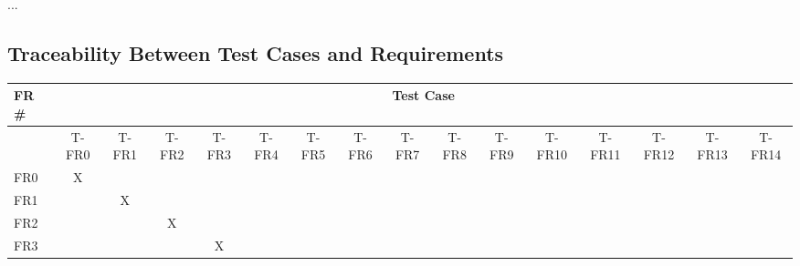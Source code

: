 \documentclass[12pt, titlepage]{article}
\begin{document}
...

\subsection{Traceability Between Test Cases and Requirements}

\setlength\LTleft{-3cm}
\tiny
\begin{longtable}{llllllllllllllll}
\multicolumn{1}{l|}{FR \#} & \multicolumn{15}{c}{Test Case} \\ \hline
\endfirsthead
%
\endhead
%
\multicolumn{1}{l|}{} & \multicolumn{1}{c}{T-FR0} & \multicolumn{1}{c}{T-FR1} & \multicolumn{1}{c}{T-FR2} & \multicolumn{1}{c}{T-FR3} & \multicolumn{1}{c}{T-FR4} & \multicolumn{1}{c}{T-FR5} & \multicolumn{1}{c}{T-FR6} & \multicolumn{1}{c}{T-FR7} & \multicolumn{1}{c}{T-FR8} & \multicolumn{1}{c}{T-FR9} & \multicolumn{1}{c}{T-FR10} & \multicolumn{1}{c}{T-FR11} & \multicolumn{1}{c}{T-FR12} & \multicolumn{1}{c}{T-FR13} & \multicolumn{1}{c}{T-FR14} \\
\multicolumn{1}{l|}{FR0} & \multicolumn{1}{c}{X} & \multicolumn{1}{c}{} & \multicolumn{1}{c}{} & \multicolumn{1}{c}{} & \multicolumn{1}{c}{} & \multicolumn{1}{c}{} & \multicolumn{1}{c}{} & \multicolumn{1}{c}{} & \multicolumn{1}{c}{} & \multicolumn{1}{c}{} &  & \multicolumn{1}{c}{} & \multicolumn{1}{c}{} & \multicolumn{1}{c}{} & \multicolumn{1}{c}{} \\
\multicolumn{1}{l|}{FR1} & \multicolumn{1}{c}{} & \multicolumn{1}{c}{X} & \multicolumn{1}{c}{} & \multicolumn{1}{c}{} & \multicolumn{1}{c}{} & \multicolumn{1}{c}{} & \multicolumn{1}{c}{} & \multicolumn{1}{c}{} & \multicolumn{1}{c}{} & \multicolumn{1}{c}{} &  & \multicolumn{1}{c}{} & \multicolumn{1}{c}{} & \multicolumn{1}{c}{} & \multicolumn{1}{c}{} \\
\multicolumn{1}{l|}{FR2} & \multicolumn{1}{c}{} & \multicolumn{1}{c}{} & \multicolumn{1}{c}{X} & \multicolumn{1}{c}{} & \multicolumn{1}{c}{} & \multicolumn{1}{c}{} & \multicolumn{1}{c}{} & \multicolumn{1}{c}{} & \multicolumn{1}{c}{} & \multicolumn{1}{c}{} &  & \multicolumn{1}{c}{} & \multicolumn{1}{c}{} & \multicolumn{1}{c}{} & \multicolumn{1}{c}{} \\
\multicolumn{1}{l|}{FR3} & \multicolumn{1}{c}{} & \multicolumn{1}{c}{} & \multicolumn{1}{c}{} & \multicolumn{1}{c}{X} & \multicolumn{1}{c}{} & \multicolumn{1}{c}{} & \multicolumn{1}{c}{} & \multicolumn{1}{c}{} & \multicolumn{1}{c}{} & \multicolumn{1}{c}{} &  & \multicolumn{1}{c}{} & \multicolumn{1}{c}{} & \multicolumn{1}{c}{} & \multicolumn{1}{c}{} \\

\end{longtable}
\end{document}
